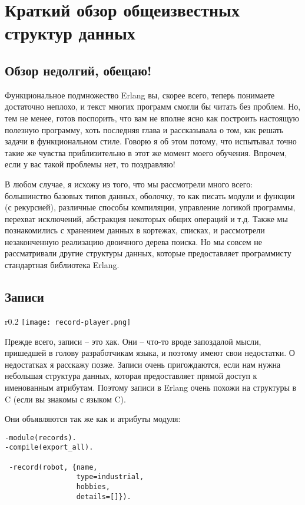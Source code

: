 \chapter{Краткий обзор общеизвестных структур данных}
\label{short-visit-to-common-data-structures}
\section{Обзор недолгий, обещаю!}
\label{wont-be-too-long-promised}
Функциональное подмножество Erlang вы, скорее всего, теперь понимаете достаточно неплохо, и текст многих программ смогли бы читать без проблем.
Но, тем не менее, готов поспорить, что вам не вполне ясно как построить настоящую полезную программу, хоть последняя глава и рассказывала о том, как решать задачи в функциональном стиле.
Говорю я об этом потому, что испытывал точно такие же чувства приблизительно в этот же момент моего обучения.
Впрочем, если у вас такой проблемы нет, то поздравляю!

В любом случае, я исхожу из того, что мы рассмотрели много всего: большинство базовых типов данных, оболочку, то как писать модули и функции (с рекурсией), различные способы компиляции, управление логикой программы, перехват исключений, абстракция некоторых общих операций и т.д.
Также мы познакомились с хранением данных в кортежах, списках, и рассмотрели незаконченную реализацию двоичного дерева поиска.
Но мы совсем не рассматривали другие структуры данных, которые предоставляет программисту стандартная библиотека Erlang.
\section{Записи}
\label{records}
\begin{wrapfigure}{r}{0.2\linewidth}
    \texttt{[image: record-player.png]}
\end{wrapfigure}
Прежде всего, записи \--- это хак.
Они \--- что\--то вроде запоздалой мысли, пришедшей в голову разработчикам языка, и поэтому имеют свои недостатки.
О недостатках я расскажу позже.
Записи очень пригождаются, если нам нужна небольшая структура данных, которая предоставляет прямой доступ к именованным атрибутам.
Поэтому записи в Erlang очень похожи на структуры в C (если вы знакомы с языком C).

Они объявляются так же как и атрибуты модуля:
\begin{lstlisting}[style=erlang]
-module(records).
-compile(export_all).
 
 -record(robot, {name,
                 type=industrial,
                 hobbies,
                 details=[]}).
\end{lstlisting}

